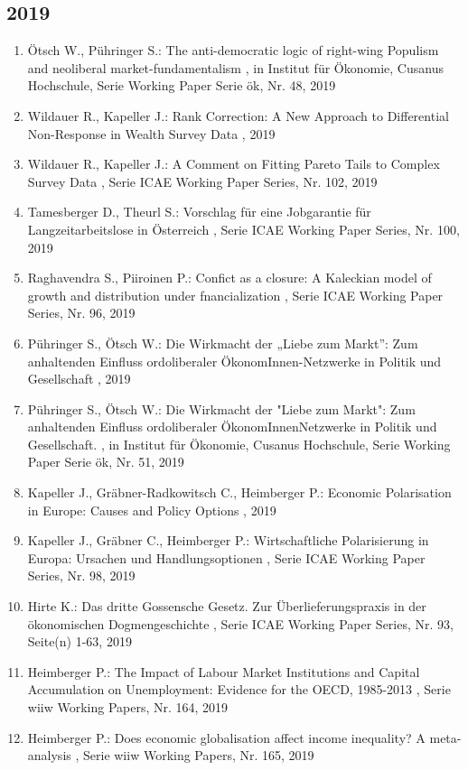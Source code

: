  \subsection*{2019} 
 \begin{enumerate}[leftmargin=*, labelsep=0.5cm] 
	 \item Ötsch W., Pühringer S.:  The anti-democratic logic of right-wing Populism and neoliberal market-fundamentalism  , in Institut für Ökonomie, Cusanus Hochschule, Serie Working Paper Serie ök, Nr. 48, 2019
	 \item Wildauer R., Kapeller J.:  Rank Correction: A New Approach to Differential Non-Response in Wealth Survey Data  , 2019
	 \item Wildauer R., Kapeller J.:  A Comment on Fitting Pareto Tails to Complex Survey Data  , Serie ICAE Working Paper Series, Nr. 102, 2019
	 \item Tamesberger D., Theurl S.:  Vorschlag für eine Jobgarantie für Langzeitarbeitslose in Österreich  , Serie ICAE Working Paper Series, Nr. 100, 2019
	 \item Raghavendra S., Piiroinen P.:  Confict as a closure: A Kaleckian model of growth and distribution under fnancialization  , Serie ICAE Working Paper Series, Nr. 96, 2019
	 \item Pühringer S., Ötsch W.:  Die Wirkmacht der „Liebe zum Markt”: Zum anhaltenden Einfluss ordoliberaler ÖkonomInnen-Netzwerke in Politik und Gesellschaft  , 2019
	 \item Pühringer S., Ötsch W.:  Die Wirkmacht der "Liebe zum Markt": Zum anhaltenden Einfluss ordoliberaler ÖkonomInnenNetzwerke in Politik und Gesellschaft.  , in Institut für Ökonomie, Cusanus Hochschule, Serie Working Paper Serie ök, Nr. 51, 2019
	 \item Kapeller J., Gräbner-Radkowitsch C., Heimberger P.:  Economic Polarisation in Europe: Causes and Policy Options  , 2019
	 \item Kapeller J., Gräbner C., Heimberger P.:  Wirtschaftliche Polarisierung in Europa: Ursachen und Handlungsoptionen  , Serie ICAE Working Paper Series, Nr. 98, 2019
	 \item Hirte K.:  Das dritte Gossensche Gesetz. Zur Überlieferungspraxis in der ökonomischen Dogmengeschichte  , Serie ICAE Working Paper Series, Nr. 93, Seite(n) 1-63, 2019
	 \item Heimberger P.:  The Impact of Labour Market Institutions and Capital Accumulation on Unemployment: Evidence for the OECD, 1985-2013  , Serie wiiw Working Papers, Nr. 164, 2019
	 \item Heimberger P.:  Does economic globalisation affect income inequality? A meta-analysis  , Serie wiiw Working Papers, Nr. 165, 2019

\end{enumerate}
